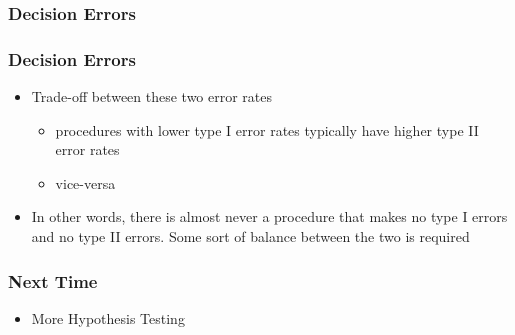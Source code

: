 \documentclass[handout]{beamer}
\newcommand{\blue}[1]{\textcolor{blue2}{#1}}
\begin{document}
\begin{frame}
\frametitle{Decision Errors}
%
%

\end{frame}


\begin{frame}
\frametitle{Decision Errors}
\begin{itemize}
\item Trade-off between these two error rates
\begin{itemize}
\item procedures with lower type I error rates typically have higher type II error rates
\item vice-versa
\end{itemize}
\pause \item In other words, there is almost never a procedure that makes no type I errors and no type II errors.  Some sort of balance between the two is required
\end{itemize}
\end{frame}


\begin{frame}[fragile]
\frametitle{Next Time}

\begin{itemize}
\item More Hypothesis Testing
\end{itemize}

\end{frame}
\end{document}
